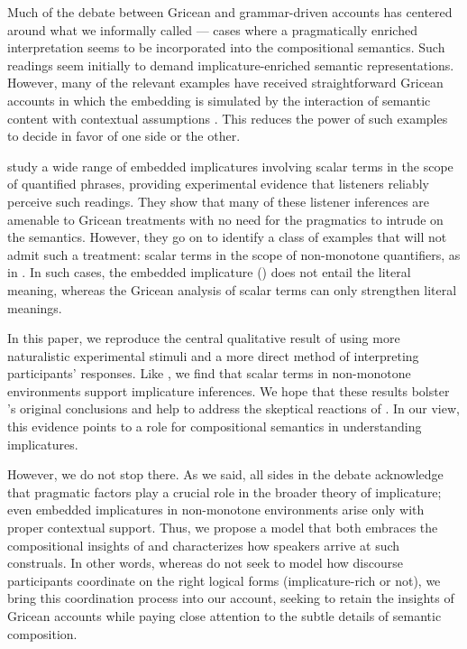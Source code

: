 \documentclass[leqno]{article}
\begin{document}
Much of the debate between Gricean and grammar-driven accounts has
centered around what we informally called 
--- cases where a pragmatically enriched interpretation seems to be
incorporated into the compositional semantics. Such readings seem
initially to demand implicature-enriched semantic representations.
However, many of the relevant examples have received straightforward
Gricean accounts in which the embedding is simulated by the
interaction of semantic content with contextual assumptions
\citep{Russell06,Geurts09}. This reduces the power of such examples to
decide in favor of one side or the other.

\citet{Chemla:Spector:2011} study a wide range of embedded
implicatures involving scalar terms in the scope of quantified
phrases, providing experimental evidence that listeners reliably
perceive such readings. They show that many of these listener
inferences are amenable to Gricean treatments with no need for the
pragmatics to intrude on the semantics. However, they go on to
identify a class of examples that will not admit such a treatment:
scalar terms in the scope of non-monotone quantifiers, as in
. In such cases, the
embedded implicature ()
does not entail the literal meaning, whereas the Gricean analysis of
scalar terms can only strengthen literal meanings.

In this paper, we reproduce the central qualitative result of
\citet{Chemla:Spector:2011} using more naturalistic experimental
stimuli and a more direct method of interpreting participants'
responses. Like \citeauthor{Chemla:Spector:2011}, we find that scalar
terms in non-monotone environments support implicature inferences. We
hope that these results bolster \citeauthor{Chemla:Spector:2011}'s
original conclusions and help to address the skeptical reactions of
\citet{geurts-vantiel:2013:scalar}. In our view, this evidence points
to a role for compositional semantics in understanding implicatures.

However, we do not stop there. As we said, all sides in the debate
acknowledge that pragmatic factors play a crucial role in the broader
theory of implicature; even embedded implicatures in non-monotone
environments arise only with proper contextual support. Thus, we
propose a model that both embraces the compositional insights of
\citeauthor{ChierchiaFoxSpector08} and characterizes how speakers
arrive at such construals. In other words, whereas
\citeauthor{ChierchiaFoxSpector08} do not seek to model how discourse
participants coordinate on the right logical forms (implicature-rich
or not), we bring this coordination process into our account, seeking
to retain the insights of Gricean accounts while paying close
attention to the subtle details of semantic composition.
\end{document}
